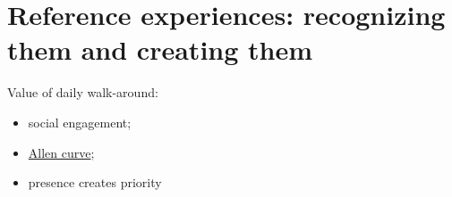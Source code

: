 \section{Reference experiences: recognizing them and creating them}

Value of daily walk-around: 
\begin{itemize}
    \item social engagement; 
\item \href{https://en.wikipedia.org/wiki/Allen_curve}{Allen curve}; 
\item \gls{presence creates priority}
\end{itemize}

